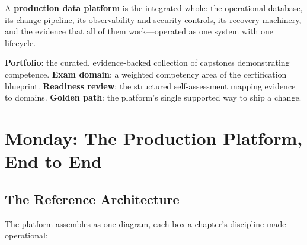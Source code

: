 \begin{definitionbox}
A \textbf{production data platform} is the integrated whole: the operational database, its change pipeline, its observability and security controls, its recovery machinery, and the evidence that all of them work---operated as one system with one lifecycle.
\end{definitionbox}

\begin{keyterms}
\textbf{Portfolio}: the curated, evidence-backed collection of capstones demonstrating competence. \textbf{Exam domain}: a weighted competency area of the certification blueprint. \textbf{Readiness review}: the structured self-assessment mapping evidence to domains. \textbf{Golden path}: the platform's single supported way to ship a change.
\end{keyterms}

\section{Monday: The Production Platform, End to End}
\subsection{The Reference Architecture}
The platform assembles as one diagram, each box a chapter's discipline made operational:

